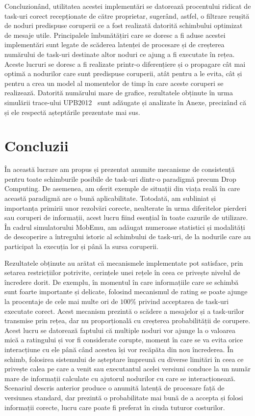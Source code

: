 \documentclass[12pt,a4paper]{report}
\begin{document}
Concluzionând, utilitatea acestei implementări se datorează procentului ridicat de task-uri corect recepționate de către proprietar, sugerând, astfel, o filtrare reușită de noduri predispuse coruperii ce a fost realizată datorită schimbului optimizat de mesaje utile. Principalele îmbunătățiri care se doresc a fi aduse acestei implementări sunt legate de scăderea latenței de procesare și de creșterea numărului de task-uri destinate altor noduri ce ajung a fi executate în rețea. Aceste lucruri se doresc a fi realizate printr-o diferențiere și o propagare cât mai optimă a nodurilor care sunt predispuse coruperii, atât pentru a le evita, cât și pentru a crea un model al momentelor de timp în care aceste coruperi se realizează. Datorită numărului mare de grafice, rezultatele obținute în urma simulării trace-ului UPB2012~\cite{upb2012} sunt adăugate și analizate în Anexe, precizând că și ele respectă așteptările prezentate mai sus. 

\chapter{Concluzii} \label{concluzii}
În această lucrare am propus și prezentat anumite mecanisme de consistență pentru toate schimburile posibile de task-uri dintr-o paradigmă precum Drop Computing. De asemenea, am oferit exemple de situații din viața reală în care această paradigmă are o bună aplicabilitate. Totodată, am subliniat și importanța primirii unor rezolvări corecte, nealterate în urma diferitelor pierderi sau coruperi de informații, acest lucru fiind esențial în toate cazurile de utilizare. În cadrul simulatorului MobEmu, am adăugat numeroase statistici și modalități de descoperire a întregului istoric al schimbului de task-uri, de la nodurile care au participat la execuția lor și până la sursa coruperii.

Rezultatele obținute au arătat că mecanismele implementate pot satisface, prin setarea restricțiilor potrivite, cerințele unei rețele în ceea ce privește nivelul de încredere dorit. De exemplu, în momentul în care informațiile care se schimbă sunt foarte importante și delicate, folosind mecanismul de rating se poate ajunge la procentaje de cele mai multe ori de $100\%$ privind acceptarea de task-uri executate corect. Acest mecanism prezintă o scădere a mesajelor și a task-urilor transmise prin rețea, dar nu proporțională cu creșterea probabilității de corupere. Acest lucru se datorează faptului că multiple noduri vor ajunge la o valoarea mică a ratingului și vor fi considerate corupte, moment în care se va evita orice interacțiune cu ele până când acestea își vor recăpăta din nou încrederea. În schimb, folosirea sistemului de așteptare împreună cu diverse limitări în ceea ce privește calea pe care a venit sau executantul acelei versiuni conduce la un număr mare de informații calculate cu ajutorul nodurilor cu care se interacționează. Scenariul descris anterior produce o anumită latență de procesare față de versiunea standard, dar prezintă o probabilitate mai bună de a accepta și folosi informații corecte, lucru care poate fi preferat în ciuda tuturor costurilor.
\end{document}
